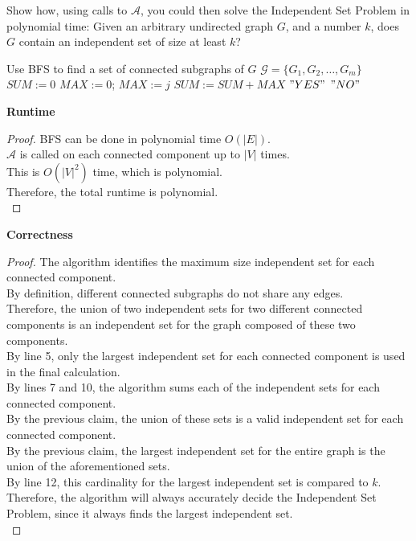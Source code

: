 \begin{problem}
    Show how, using calls to $\mathcal{A}$, you could then solve the Independent Set Problem in polynomial time: Given an arbitrary undirected
    graph $G$, and a number $k$, does $G$ contain an independent set of size at least $k$?
    \begin{algorithmic}[1]
        \STATE Use BFS to find a set of connected subgraphs of $G$ $\mathcal{G} = \{G_1, G_2, \dots, G_m\}$
        \STATE $SUM := 0$
            \STATE $MAX := 0$;
                    \STATE $MAX := j$
                \ENDIF
            \ENDFOR
            \STATE $SUM := SUM + MAX$
        \ENDFOR
        \RETURN $"YES"$
        \ELSE
        \RETURN $"NO"$
        \ENDIF
    \end{algorithmic}
    \textbf{Runtime}
    \begin{proof}
        BFS can be done in polynomial time $O(|E|)$. \\
        $\mathcal{A}$ is called on each connected component up to $|V|$ times. \\
        This is $O(|V|^2)$ time, which is polynomial. \\
        Therefore, the total runtime is polynomial. \\
    \end{proof}
    \textbf{Correctness}
    \begin{proof}
        The algorithm identifies the maximum size independent set for each connected component. \\
        By definition, different connected subgraphs do not share any edges. \\
        Therefore, the union of two independent sets for two different connected components is an independent set
        for the graph composed of these two components. \\
        By line 5, only the largest independent set for each connected component is used in the final calculation. \\
        By lines 7 and 10, the algorithm sums each of the independent sets for each connected component. \\
        By the previous claim, the union of these sets is a valid independent set for each connected component. \\
        By the previous claim, the largest independent set for the entire graph is the union of the aforementioned sets. \\
        By line 12, this cardinality for the largest independent set is compared to $k$. \\
        Therefore, the algorithm will always accurately decide the Independent Set Problem, since it always finds the largest independent set. \\
    \end{proof}
\end{problem}

